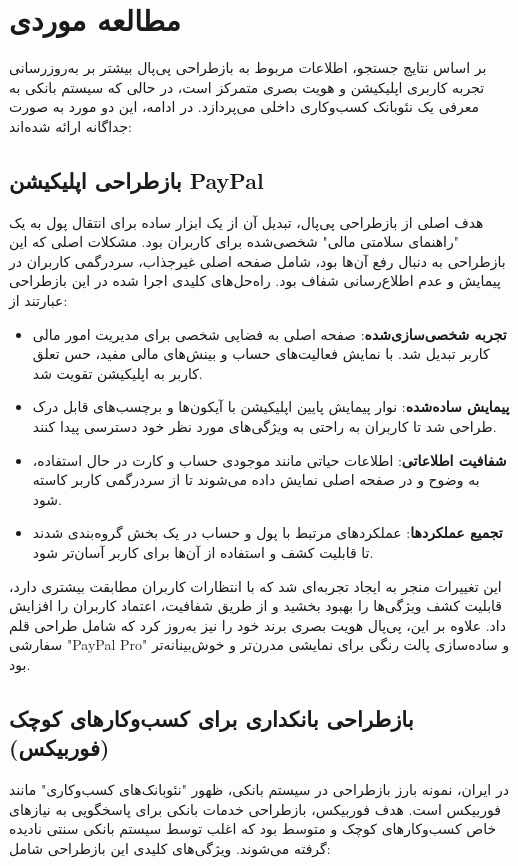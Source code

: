 \section{مطالعه موردی}
\label{section:7}

بر اساس نتایج جستجو، اطلاعات مربوط به بازطراحی پی‌پال بیشتر بر به‌روزرسانی تجربه کاربری اپلیکیشن و هویت بصری متمرکز است، در حالی که سیستم بانکی به معرفی یک نئوبانک کسب‌وکاری داخلی می‌پردازد. در ادامه، این دو مورد به صورت جداگانه ارائه شده‌اند:

\subsection{بازطراحی اپلیکیشن PayPal}
هدف اصلی از بازطراحی پی‌پال، تبدیل آن از یک ابزار ساده برای انتقال پول به یک "راهنمای سلامتی مالی" شخصی‌شده برای کاربران بود. مشکلات اصلی که این بازطراحی به دنبال رفع آن‌ها بود، شامل صفحه اصلی غیرجذاب، سردرگمی کاربران در پیمایش و عدم اطلاع‌رسانی شفاف بود. راه‌حل‌های کلیدی اجرا شده در این بازطراحی عبارتند از:

\begin{itemize}
    \item \textbf{تجربه شخصی‌سازی‌شده}: صفحه اصلی به فضایی شخصی برای مدیریت امور مالی کاربر تبدیل شد. با نمایش فعالیت‌های حساب و بینش‌های مالی مفید، حس تعلق کاربر به اپلیکیشن تقویت شد.
    \item \textbf{پیمایش ساده‌شده}: نوار پیمایش پایین اپلیکیشن با آیکون‌ها و برچسب‌های قابل درک طراحی شد تا کاربران به راحتی به ویژگی‌های مورد نظر خود دسترسی پیدا کنند.
    \item \textbf{شفافیت اطلاعاتی}: اطلاعات حیاتی مانند موجودی حساب و کارت در حال استفاده، به وضوح و در صفحه اصلی نمایش داده می‌شوند تا از سردرگمی کاربر کاسته شود.
    \item \textbf{تجمیع عملکردها}: عملکردهای مرتبط با پول و حساب در یک بخش گروه‌بندی شدند تا قابلیت کشف و استفاده از آن‌ها برای کاربر آسان‌تر شود.
\end{itemize}

این تغییرات منجر به ایجاد تجربه‌ای شد که با انتظارات کاربران مطابقت بیشتری دارد، قابلیت کشف ویژگی‌ها را بهبود بخشید و از طریق شفافیت، اعتماد کاربران را افزایش داد. علاوه بر این، پی‌پال هویت بصری برند خود را نیز به‌روز کرد که شامل طراحی قلم سفارشی "PayPal Pro" و ساده‌سازی پالت رنگی برای نمایشی مدرن‌تر و خوش‌بینانه‌تر بود.

\subsection{بازطراحی بانکداری برای کسب‌وکارهای کوچک (فوربیکس)}
در ایران، نمونه بارز بازطراحی در سیستم بانکی، ظهور "نئوبانک‌های کسب‌وکاری" مانند فوربیکس است. هدف فوربیکس، بازطراحی خدمات بانکی برای پاسخگویی به نیازهای خاص کسب‌وکارهای کوچک و متوسط بود که اغلب توسط سیستم بانکی سنتی نادیده گرفته می‌شوند. ویژگی‌های کلیدی این بازطراحی شامل:

